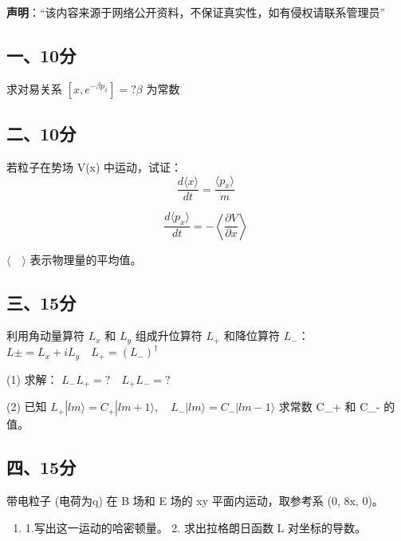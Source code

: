 
\textbf{声明}：“该内容来源于网络公开资料，不保证真实性，如有侵权请联系管理员”

\subsection{一、10分}
求对易关系 $[x, e^{-\beta p_x}] = ? \beta$ 为常数
\subsection{二、10分}
若粒子在势场  V(x) 中运动，试证：
$$\frac{d \langle x \rangle}{dt} = \frac{\langle p_x \rangle}{m}~$$

$$\frac{d \langle p_x \rangle}{dt} = -\left\langle \frac{\partial V}{\partial x} \right\rangle~$$

$\langle \quad \rangle$ 表示物理量的平均值。
\subsection{三、15分}
利用角动量算符 $L_x$ 和 $L_y$ 组成升位算符 $L_+$ 和降位算符 $L_-$：
$L\pm = L_x + i L_y \quad L_+ = (L_-)^\dagger$

(1) 求解： $L_- L_+ = ? \quad L_+ L_- = ?$

(2) 已知 $L_+ |l m \rangle = C_+ |lm + 1 \rangle, \quad L_- |lm \rangle = C_- |lm - 1 \rangle$
求常数 C_+ 和 C_- 的值。
\subsection{四、15分}
带电粒子 (电荷为q) 在 B 场和 E 场的 xy 平面内运动，取参考系 (0, 8x, 0)。
\begin{enumerate}
\item 1.写出这一运动的哈密顿量。
2. 求出拉格朗日函数 L 对坐标的导数。
\end{enumerate}

